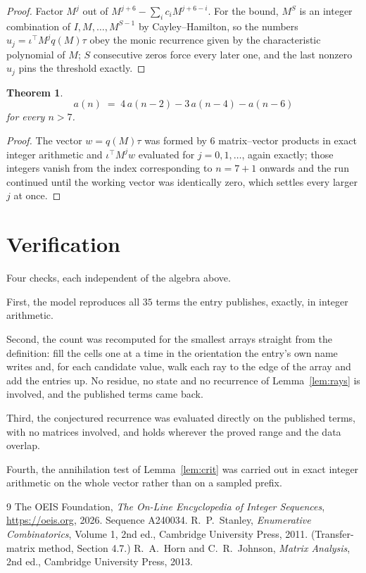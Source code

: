 \documentclass[11pt,a4paper]{article}
\theoremstyle{plain}
\newtheorem{theorem}{Theorem}
\theoremstyle{definition}
\begin{document}
\begin{proof}
Factor $M^{j}$ out of $M^{j+6}-\sum_ic_iM^{j+6-i}$. For the bound, $M^{S}$
is an integer combination of $I,M,\dots,M^{S-1}$ by Cayley--Hamilton, so the numbers
$u_j=\iota^{\!\top}M^{j}q(M)\tau$ obey the monic recurrence given by the characteristic
polynomial of $M$; $S$ consecutive zeros force every later one, and the last nonzero $u_j$
pins the threshold exactly.
\end{proof}

\begin{theorem}
\[
a(n)\;=\;4\,a(n-2) - 3\,a(n-4) - a(n-6)
\]
for every $n>7$.
\end{theorem}

\begin{proof}
The vector $w=q(M)\tau$ was formed by $6$ matrix--vector products in exact integer
arithmetic and $\iota^{\!\top}M^{j}w$ evaluated for $j=0,1,\dots$, again exactly; those
integers vanish from the index corresponding to $n=7+1$ onwards and the run continued
until the working vector was identically zero, which settles every larger $j$ at once.
\end{proof}

\section{Verification}

Four checks, each independent of the algebra above.

First, the model reproduces all $35$ terms the entry publishes, exactly, in integer
arithmetic.

Second, the count was recomputed for the smallest arrays straight from the definition: fill the
cells one at a time in the orientation the entry's own name writes and, for each candidate
value, walk each ray to the edge of the array and add the entries up. No residue, no state and
no recurrence of Lemma~\ref{lem:rays} is involved, and the published terms came back.

Third, the conjectured recurrence was evaluated directly on the published terms, with no
matrices involved, and holds wherever the proved range and the data overlap.

Fourth, the annihilation test of Lemma~\ref{lem:crit} was carried out in exact integer
arithmetic on the whole vector rather than on a sampled prefix.

\begin{thebibliography}{9}
 The OEIS Foundation, \emph{The On-Line Encyclopedia of Integer
Sequences}, \url{https://oeis.org}, 2026. Sequence A240034.
 R.~P.~Stanley, \emph{Enumerative Combinatorics}, Volume 1, 2nd ed.,
Cambridge University Press, 2011. (Transfer-matrix method, Section 4.7.)
 R.~A.~Horn and C.~R.~Johnson, \emph{Matrix Analysis}, 2nd ed., Cambridge
University Press, 2013.
\end{thebibliography}
\end{document}
